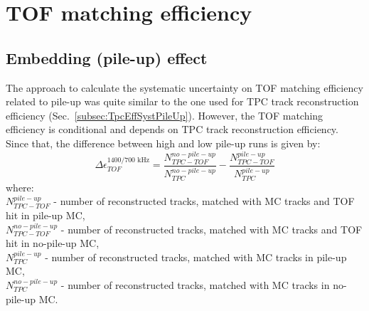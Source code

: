 \section{TOF matching efficiency}\label{sec:tofSystematics}
\subsection{Embedding (pile-up) effect}
The approach to calculate the systematic uncertainty on TOF matching efficiency related to pile-up was quite similar to the one used for TPC track reconstruction efficiency (Sec.~\ref{subsec:TpcEffSystPileUp}). However, the TOF matching efficiency is conditional and depends on TPC track reconstruction efficiency. Since that, the difference between high and low pile-up runs is given by:
\begin{equation}
\Delta\epsilon_{ TOF}^{1400/700\text{ kHz}}=\frac{N_{TPC-TOF}^{no-pile-up}}{N_{TPC}^{no-pile-up}}-\frac{N_{TPC-TOF}^{pile-up}}{N_{TPC}^{pile-up}}
\label{eq:tofSyst}
\end{equation}
where:\\
$N_{TPC-TOF}^{pile-up}$ - number of reconstructed tracks, matched with MC tracks and TOF hit in pile-up MC,\\
$N_{TPC-TOF}^{no-pile-up}$ - number of reconstructed tracks, matched with MC tracks and TOF hit in no-pile-up MC,\\
$N_{TPC}^{pile-up}$ - number of reconstructed tracks, matched with MC tracks in pile-up MC,\\
$N_{TPC}^{no-pile-up}$ - number of reconstructed tracks, matched with MC tracks in no-pile-up MC.

